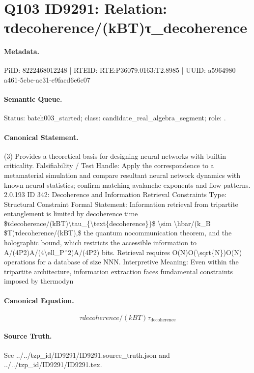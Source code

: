 \section*{Q103 ID9291: Relation: τdecoherence/(kBT)τ\_decoherence}
\paragraph{Metadata.}
PiID: 8222468012248 | RTEID: RTE:P36079.0163:T2.8985 | UUID: a5964980-a461-5cbe-ae31-e9facd6e6c07

\paragraph{Semantic Queue.}
Status: batch003\_started; class: candidate\_real\_algebra\_segment; role: .

\paragraph{Canonical Statement.}
(3) Provides a theoretical basis for designing neural networks with builtin criticality. Falsifiability / Test Handle: Apply the correspondence to a metamaterial simulation and compare resultant neural network dynamics with known neural statistics; confirm matching avalanche exponents and flow patterns. 2.0.193 ID 342: Decoherence and Information Retrieval Constraints Type: Structural Constraint Formal Statement: Information retrieval from tripartite entanglement is limited by decoherence time \$τdecoherence/(kBT)\textbackslash{}tau\_\{\textbackslash{}text\{decoherence\}\}\$ \textbackslash{}sim \textbackslash{}hbar/(k\_B \$T)τdecoherence/(kBT),\$ the quantum nocommunication theorem, and the holographic bound, which restricts the accessible information to A/(4P2)A/(4\textbackslash{}ell\_Pˆ2)A/(4P2) bits. Retrieval requires O(N)O(\textbackslash{}sqrt\{N\})O(N) operations for a database of size NNN. Interpretive Meaning: Even within the tripartite architecture, information extraction faces fundamental constraints imposed by thermodyn

\paragraph{Canonical Equation.}
\[
τdecoherence/(kBT)\tau_{\text{decoherence}}
\]

\paragraph{Source Truth.}
See ../../tzp\_id/ID9291/ID9291.source\_truth.json and ../../tzp\_id/ID9291/ID9291.tex.
